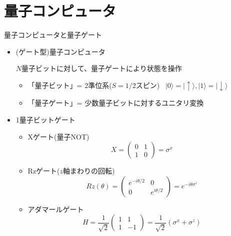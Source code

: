\section{量子コンピュータ}

\begin{frame}[t,fragile]{量子コンピュータと量子ゲート}
  \begin{itemize}
  \item (ゲート型)量子コンピュータ

    $N$量子ビットに対して、量子ゲートにより状態を操作

    \begin{itemize}
    \item 「量子ビット」= 2準位系($S=1/2$スピン) \ $|0\rangle=|\!\uparrow\rangle, |1\rangle=|\!\downarrow\rangle$
    \item 「量子ゲート」= 少数量子ビットに対するユニタリ変換
    \end{itemize}
  \item 1量子ビットゲート
    \begin{itemize}
    \item Xゲート(量子NOT)
      \[
      X = \begin{pmatrix} 0 & 1 \\ 1 & 0 \end{pmatrix} = \sigma^x
      \]
    \item Rzゲート($z$軸まわりの回転)
      \[
      Rz(\theta) = \begin{pmatrix} e^{-i\theta/2} & 0 \\ 0 & e^{i\theta/2} \end{pmatrix} = e^{-i\theta\sigma^z}
      \]
    \item アダマールゲート
      \[
      H = \frac{1}{\sqrt{2}} \begin{pmatrix} 1 & 1 \\ 1 & -1 \end{pmatrix} = \frac{1}{\sqrt{2}} (\sigma^x + \sigma^z)
      \]
    \end{itemize}
  \end{itemize}
\end{frame}

